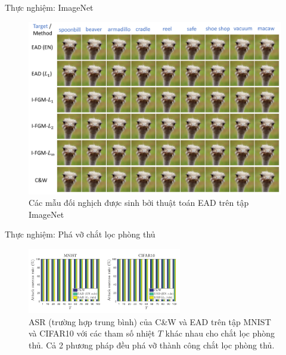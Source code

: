 \begin{frame}{Thực nghiệm: ImageNet}
    \begin{figure}
        \centering
        \includegraphics[scale=0.2]{images/fig_07.png}
        \caption{Các mẫu đối nghịch được sinh bởi thuật toán EAD trên tập ImageNet}%
        \label{fig:fg_05}
    \end{figure}
\end{frame}
    
\begin{frame}{Thực nghiệm: Phá vỡ chắt lọc phòng thủ}
    \begin{figure}[H] %
        \centering %
        \includegraphics[width=0.6\textwidth]{images/fig_3.png} 
        \caption{ASR (trường hợp trung bình) của C\&W và EAD trên tập MNIST và CIFAR10 với các tham số nhiệt $T$ khác nhau cho chắt lọc phòng thủ. Cả 2 phương pháp đều phá vỡ thành công chắt lọc phòng thủ.} %
        \label{fig:fg_03}
    \end{figure}
\end{frame}

